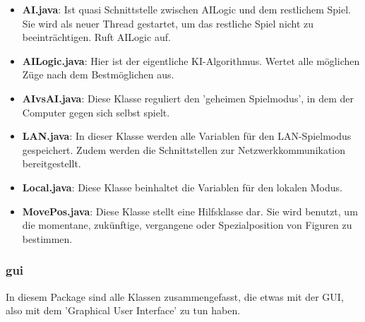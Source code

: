 \documentclass[12pt,a4paper]{article}
\begin{document}
\begin{itemize}

	\item{\textbf{AI.java}: Ist quasi Schnittstelle zwischen AILogic und dem restlichem Spiel. Sie wird als neuer Thread gestartet, um das restliche Spiel nicht zu beeinträchtigen. Ruft AILogic auf.}
	
	\item{\textbf{AILogic.java}: Hier ist der eigentliche KI-Algorithmus. Wertet alle möglichen Züge nach dem Bestmöglichen aus.}

	\item{\textbf{AIvsAI.java}: Diese Klasse reguliert den 'geheimen Spielmodus', in dem der Computer gegen sich selbst spielt. }
	
	\item{\textbf{LAN.java}: In dieser Klasse werden alle Variablen für den LAN-Spielmodus gespeichert. Zudem werden die Schnittstellen zur Netzwerkkommunikation bereitgestellt.}
	
	\item{\textbf{Local.java}: Diese Klasse beinhaltet die Variablen für den lokalen Modus. }

	\item{\textbf{MovePos.java}: Diese Klasse stellt eine Hilfsklasse dar. Sie wird benutzt, um die momentane, zukünftige, vergangene oder Spezialposition von Figuren zu bestimmen.}

\end{itemize}

\subsubsection{gui}

In diesem Package sind alle Klassen zusammengefasst, die etwas mit der GUI, also mit dem 'Graphical User Interface' zu tun haben. 
\end{document}
